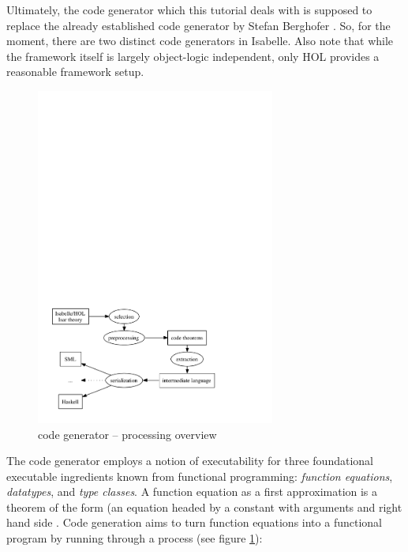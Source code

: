 \begin{isabellebody}
\begin{isamarkuptext}
  \begin{warn}
    Ultimately, the code generator which this tutorial deals with
    is supposed to replace the already established code generator
    by Stefan Berghofer \cite{Berghofer-Nipkow:2002}.
    So, for the moment, there are two distinct code generators
    in Isabelle.
    Also note that while the framework itself is largely
    object-logic independent, only HOL provides a reasonable
    framework setup.    
  \end{warn}%
\end{isamarkuptext}%
\isamarkuptrue%
%
\isamarkuptrue%
%
\begin{isamarkuptext}%
\begin{figure}[h]
  \centering
  \includegraphics[width=0.7\textwidth]{codegen_process}
  \caption{code generator -- processing overview}
  \label{fig:process}
  \end{figure}

  The code generator employs a notion of executability
  for three foundational executable ingredients known
  from functional programming:
  \emph{function equations}, \emph{datatypes}, and
  \emph{type classes}. A function equation as a first approximation
  is a theorem of the form 
  (an equation headed by a constant  with arguments
   and right hand side .
  Code generation aims to turn function equations
  into a functional program by running through
  a process (see figure \ref{fig:process}):


\end{isamarkuptext}
\end{isabellebody}

